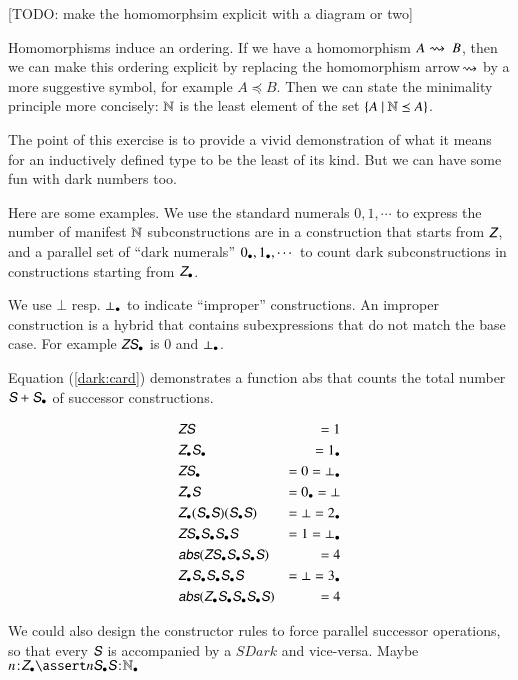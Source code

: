 [TODO: make the homomorphsim explicit with a diagram or two]

Homomorphisms induce an ordering. If we have a homomorphism \(A~\hspace{-2pt}\rightsquigarrow~B\), then we can make this ordering explicit by replacing the
homomorphism arrow \(\hspace{-2pt}\rightsquigarrow\) by a more suggestive symbol, for
example \(A\preceq B\). Then we can state the minimality principle
more concisely: \(\mathbb{N}\) is the least element of the set \(\{A\ |\
  \mathbb{N}\preceq A\}\).

The point of this exercise is to provide a vivid demonstration of what
it means for an inductively defined type to be the least of its kind.
But we can have some fun with dark numbers too.

Here are some examples. We use the standard numerals \(0, 1,\cdots\)
to express the number of manifest \(\mathbb{N}\) subconstructions are in a
construction that starts from \(\ZNat\), and a parallel set of ``dark
numerals'' \(0_{\bullet}, 1_{\bullet}, \cdots\) to count dark
subconstructions in constructions starting from \(\ZDark\).

We use \(\bot\) resp. \(\bot_{\bullet}\) to indicate ``improper''
constructions. An improper construction is a hybrid that contains
subexpressions that do not match the base case. For example
\(\ZNat\SDark\) is \(0\) and \(\bot_{\bullet}\).

Equation (\ref{dark:card}) demonstrates a function \textsf{abs} that
counts the total number \(\SNat + \SDark\) of successor constructions.

\begin{align}
  & \ZS & = 1 \\
  & \ZDark\SDark & = \dark{1}\\
  & \ZNat\SDark & = 0 = \dark{\bot}\\
  & \ZDark\SNat & = \dark{0} = \bot \\
  & \ZDark(\SDark\SNat)(\SDark\SNat) & = \bot = \dark{2} \\
  & \ZNat\SDark\SDark\SDark\SNat & = 1 = \dark{\bot} \label{dark:hybrid} \\
  & \textsf{\slshape abs}(\ZNat\SDark\SDark\SDark\SNat) & = 4 \label{dark:card} \\
  & \ZDark\SDark\SDark\SDark\SNat & = \bot = \dark{3} \\
  & \textsf{\slshape abs}(\ZDark\SDark\SDark\SDark\SNat) & = 4
\end{align}

We could also design the constructor rules to force parallel successor
operations, so that every \(\SNat\) is accompanied by a \(SDark\) and
vice-versa.  Maybe \(\tj{n}{\ZDark} \linfer \tj{n\SDark\SNat}{\NDark}\)


